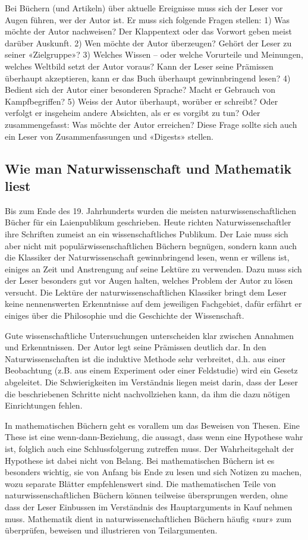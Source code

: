 \documentclass[a4paper,11pt]{scrartcl}
\begin{document}
Bei Büchern (und Artikeln) über aktuelle Ereignisse muss sich der Leser vor Augen führen, wer der Autor ist. Er muss sich folgende Fragen stellen: 1) Was möchte der Autor nachweisen? Der Klappentext oder das Vorwort geben meist darüber Auskunft. 2) Wen möchte der Autor überzeugen? Gehört der Leser zu seiner «Zielgruppe»? 3) Welches Wissen – oder welche Vorurteile und Meinungen, welches Weltbild setzt der Autor voraus? Kann der Leser seine Prämissen überhaupt akzeptieren, kann er das Buch überhaupt gewinnbringend lesen? 4) Bedient sich der Autor einer besonderen Sprache? Macht er Gebrauch von Kampfbegriffen? 5) Weiss der Autor überhaupt, worüber er schreibt? Oder verfolgt er insgeheim andere Absichten, als er es vorgibt zu tun? Oder zusammengefasst: Was möchte der Autor erreichen? Diese Frage sollte sich auch ein Leser von Zusammenfassungen und «Digests» stellen.

\subsection{Wie man Naturwissenschaft und Mathematik liest}

Bis zum Ende des 19. Jahrhunderts wurden die meisten naturwissenschaftlichen Bücher für ein Laienpublikum geschrieben. Heute richten Naturwissenschaftler ihre Schriften zumeist an ein wissenschaftliches Publikum. Der Laie muss sich aber nicht mit populärwissenschaftlichen Büchern begnügen, sondern kann auch die Klassiker der Naturwissenschaft gewinnbringend lesen, wenn er willens ist, einiges an Zeit und Anstrengung auf seine Lektüre zu verwenden. Dazu muss sich der Leser besonders gut vor Augen halten, welches Problem der Autor zu lösen versucht. Die Lektüre der naturwissenschaftlichen Klassiker bringt dem Leser keine nennenswerten Erkenntnisse auf dem jeweiligen Fachgebiet, dafür erfährt er einiges über die Philosophie und die Geschichte der Wissenschaft.

Gute wissenschaftliche Untersuchungen unterscheiden klar zwischen Annahmen und Erkenntnissen. Der Autor legt seine Prämissen deutlich dar. In den Naturwissenschaften ist die induktive Methode sehr verbreitet, d.h. aus einer Beobachtung (z.B. aus einem Experiment oder einer Feldstudie) wird ein Gesetz abgeleitet. Die Schwierigkeiten im Verständnis liegen meist darin, dass der Leser die beschriebenen Schritte nicht nachvollziehen kann, da ihm die dazu nötigen Einrichtungen fehlen.

In mathematischen Büchern geht es vorallem um das Beweisen von Thesen. Eine These ist eine wenn-dann-Beziehung, die aussagt, dass wenn eine Hypothese wahr ist, folglich auch eine Schlussfolgerung zutreffen muss. Der Wahrheitsgehalt der Hypothese ist dabei nicht von Belang. Bei mathematischen Büchern ist es besonders wichtig, sie von Anfang bis Ende zu lesen und sich Notizen zu machen, wozu separate Blätter empfehlenswert sind. Die mathematischen Teile von naturwissenschaftlichen Büchern können teilweise übersprungen werden, ohne dass der Leser Einbussen im Verständnis des Hauptarguments in Kauf nehmen muss. Mathematik dient in naturwissenschaftlichen Büchern häufig «nur» zum überprüfen, beweisen und illustrieren von Teilargumenten.
\end{document}
